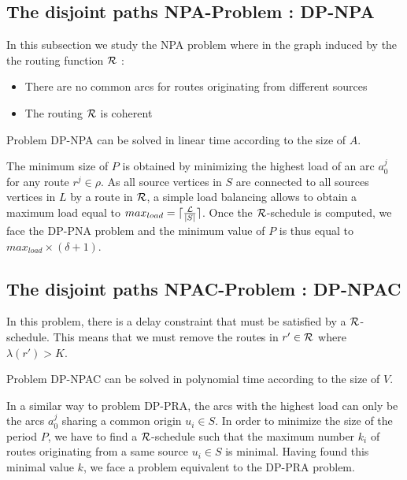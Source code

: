 \documentclass{article}
\newcommand\rschedule{$\cal R$-schedule\xspace}
\begin{document}
\subsection{The disjoint paths NPA-Problem : DP-NPA}

In this subsection we study the NPA problem where in the graph induced by the the routing function $\cal R$ :
\begin{itemize}
\item There are no common arcs for routes originating from different sources
\item The routing $\cal R$ is coherent 
\end{itemize}

\begin{proposition}
\label{DP-NPA}
Problem DP-NPA can be solved in linear time according to the size of $A$.
\end{proposition}

The minimum size of $P$ is obtained by minimizing the highest load of an arc $a_0^j$ for any route $r^j \in \rho$. As all source vertices in $S$ are connected to all sources vertices in $L$ by a route in $\cal R$, a simple load balancing allows to obtain a maximum load equal to  $max_{load} = \lceil \frac{\cal L}{|S|} \rceil$. Once the \rschedule is computed, we face the DP-PNA problem and the minimum value of $P$ is thus equal to $max_{load} \times (\delta + 1)$.
 
\subsection{The disjoint paths NPAC-Problem : DP-NPAC}

In this problem, there is a delay constraint that must be satisfied by a \rschedule. This means that we must remove the routes in $r' \in \cal R$ where $\lambda(r') > K$.

\begin{proposition}
\label{DP-NPAC}
Problem DP-NPAC can be solved in polynomial time according to the size of $V$.
\end{proposition}

In a similar way to problem DP-PRA, the arcs with the highest load can only be the arcs $a_0^j$ sharing a common origin $u_i \in S$. In order to minimize the size of the period $P$, we have to find a \rschedule such that the maximum number $k_i$ of routes originating from a same source $u_i \in S$ is minimal. Having found this minimal value $k$, we face a problem equivalent to the DP-PRA problem.
\end{document}
